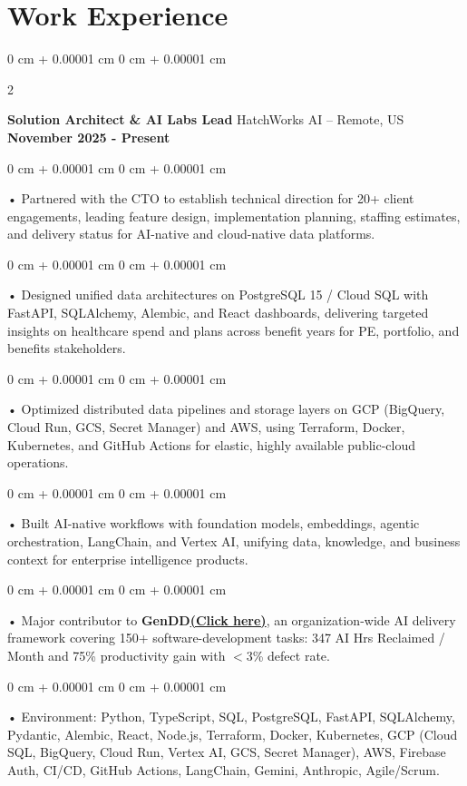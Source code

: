 \documentclass[10pt, letterpaper]{article}
\newenvironment{onecolentry}{
    \begin{adjustwidth}{
        0 cm + 0.00001 cm
    }{
        0 cm + 0.00001 cm
    }
}{
    \end{adjustwidth}
} %
\newenvironment{twocolentry}[2][]{
    \onecolentry
    \def\secondColumn{#2}
    \setcolumnwidth{\fill, 4.5 cm}
    \begin{paracol}{2}
}{
    \switchcolumn \raggedleft \secondColumn
    \end{paracol}
    \endonecolentry
} %
\begin{document}
    \vspace{0.5cm}
    \section{Work Experience}
        \vspace{0.1cm}

        \begin{twocolentry}{
            \textbf{November 2025 - Present}
        }
            \textbf{Solution Architect \& AI Labs Lead} HatchWorks AI -- Remote, US\end{twocolentry}

        \begin{onecolentry}
             • Partnered with the CTO to establish technical direction for 20+ client engagements, leading feature design, implementation planning, staffing estimates, and delivery status for AI-native and cloud-native data platforms.
        \end{onecolentry}
        \begin{onecolentry}
             • Designed unified data architectures on PostgreSQL 15 / Cloud SQL with FastAPI, SQLAlchemy, Alembic, and React dashboards, delivering targeted insights on healthcare spend and plans across benefit years for PE, portfolio, and benefits stakeholders.
        \end{onecolentry}
        \begin{onecolentry}
             • Optimized distributed data pipelines and storage layers on GCP (BigQuery, Cloud Run, GCS, Secret Manager) and AWS, using Terraform, Docker, Kubernetes, and GitHub Actions for elastic, highly available public-cloud operations.
        \end{onecolentry}
        \begin{onecolentry}
             • Built AI-native workflows with foundation models, embeddings, agentic orchestration, LangChain, and Vertex AI, unifying data, knowledge, and business context for enterprise intelligence products.
        \end{onecolentry}
        \begin{onecolentry}
             • Major contributor to \textbf{GenDD}\href{https://hatchworks.com/generative-driven-development/}{\textbf{(Click here)}}, an organization-wide AI delivery framework covering 150+ software-development tasks: 347 AI Hrs Reclaimed / Month and 75\% productivity gain with $<$3\% defect rate.
        \end{onecolentry}
        \begin{onecolentry}
             • Environment: Python, TypeScript, SQL, PostgreSQL, FastAPI, SQLAlchemy, Pydantic, Alembic, React, Node.js, Terraform, Docker, Kubernetes, GCP (Cloud SQL, BigQuery, Cloud Run, Vertex AI, GCS, Secret Manager), AWS, Firebase Auth, CI/CD, GitHub Actions, LangChain, Gemini, Anthropic, Agile/Scrum.
        \end{onecolentry}
\end{document}
